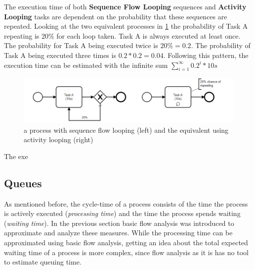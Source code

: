 \begin{itemize}
	The execution time of both \textbf{Sequence Flow Looping} sequences and \textbf{Activity Looping} tasks are dependent on the probability that these sequences are repeated. Looking at the two equivalent processes in \ref{fig:repeated-example} the probability of Task A repeating is 20\% for each loop taken. Task A is always executed at least once. The probability for Task A being executed twice is $20\% = 0.2$. The probability of Task A being executed three times is $0.2 * 0.2 = 0.04$. Following this pattern, the execution time can be estimated with the infinite sum $
	\displaystyle\sum_{i=1}^{\infty} 0.2^i * 10s$
	

	\begin{figure}[H]
		\centering
		\includegraphics[width=0.9\columnwidth]{graphics/repeated-example}
		\caption{a process with sequence flow looping (left) and the equivalent using activity looping (right)} 
		\label{fig:repeated-example} 
	\end{figure}
\end{itemize}

The exe


%	



\subsection{Queues}
As mentioned before, the \gls{cycle-time} of a process consists of the time the process is actively executed (\textit{processing time}) and the time the process spends waiting (\textit{waiting time}). In the previous section basic flow analysis was introduced to approximate and analyze these measures.  
While the processing time can be approximated using basic flow analysis, getting an idea about the total expected waiting time of a process is more complex, since flow analysis as it is has no tool to estimate queuing time. 

